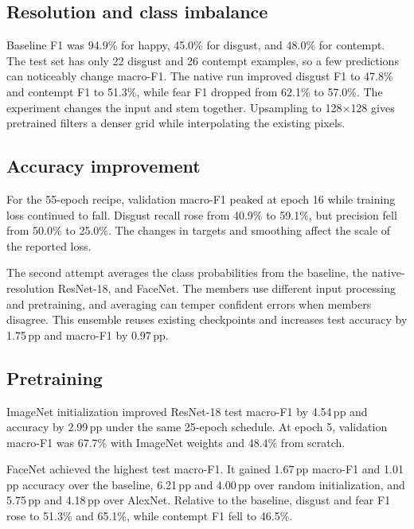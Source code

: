 \documentclass[10pt,letterpaper]{article}
\newcommand{\metric}[1]{#1\%}
\newcommand{\pp}[1]{#1\,pp}
\newcommand{\sizepx}[1]{#1\ensuremath{\times}#1}
\begin{document}
\subsection*{Resolution and class imbalance}

Baseline F1 was \metric{94.9} for happy, \metric{45.0} for disgust, and \metric{48.0} for contempt. The test set has only 22 disgust and 26 contempt examples, so a few predictions can noticeably change macro-F1. The native run improved disgust F1 to \metric{47.8} and contempt F1 to \metric{51.3}, while fear F1 dropped from \metric{62.1} to \metric{57.0}. The experiment changes the input and stem together. Upsampling to \sizepx{128} gives pretrained filters a denser grid while interpolating the existing pixels.

\subsection*{Accuracy improvement}

For the 55-epoch recipe, validation macro-F1 peaked at epoch 16 while training loss continued to fall. Disgust recall rose from \metric{40.9} to \metric{59.1}, but precision fell from \metric{50.0} to \metric{25.0}. The changes in targets and smoothing affect the scale of the reported loss.

The second attempt averages the class probabilities from the baseline, the native-resolution ResNet-18, and FaceNet. The members use different input processing and pretraining, and averaging can temper confident errors when members disagree. This ensemble reuses existing checkpoints and increases test accuracy by \pp{1.75} and macro-F1 by \pp{0.97}.

\subsection*{Pretraining}

ImageNet initialization improved ResNet-18 test macro-F1 by \pp{4.54} and accuracy by \pp{2.99} under the same 25-epoch schedule. At epoch 5, validation macro-F1 was \metric{67.7} with ImageNet weights and \metric{48.4} from scratch.

FaceNet achieved the highest test macro-F1. It gained \pp{1.67} macro-F1 and \pp{1.01} accuracy over the baseline, \pp{6.21} and \pp{4.00} over random initialization, and \pp{5.75} and \pp{4.18} over AlexNet. Relative to the baseline, disgust and fear F1 rose to \metric{51.3} and \metric{65.1}, while contempt F1 fell to \metric{46.5}.
\end{document}
